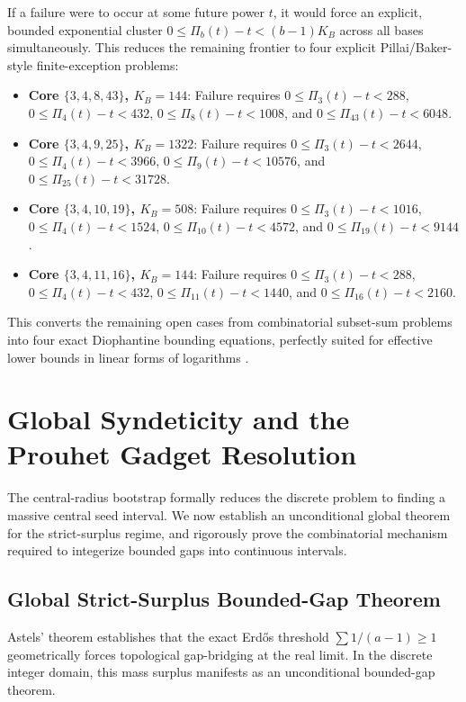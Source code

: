 \documentclass[12pt,reqno]{amsart}
\theoremstyle{definition}
\begin{document}
If a failure were to occur at some future power $t$, it would force an explicit, bounded exponential cluster $0 \le \Pi_b(t) - t < (b-1)K_B$ across all bases simultaneously. This reduces the remaining frontier to four explicit Pillai/Baker-style finite-exception problems:
\begin{itemize}
\item \textbf{Core $\{3,4,8,43\}$, $K_B = 144$}: Failure requires $0 \le \Pi_3(t) - t < 288$, $0 \le \Pi_4(t) - t < 432$, $0 \le \Pi_8(t) - t < 1008$, and $0 \le \Pi_{43}(t) - t < 6048$.
\item \textbf{Core $\{3,4,9,25\}$, $K_B = 1322$}: Failure requires $0 \le \Pi_3(t) - t < 2644$, $0 \le \Pi_4(t) - t < 3966$, $0 \le \Pi_9(t) - t < 10576$, and $0 \le \Pi_{25}(t) - t < 31728$.
\item \textbf{Core $\{3,4,10,19\}$, $K_B = 508$}: Failure requires $0 \le \Pi_3(t) - t < 1016$, $0 \le \Pi_4(t) - t < 1524$, $0 \le \Pi_{10}(t) - t < 4572$, and $0 \le \Pi_{19}(t) - t < 9144$.
\item \textbf{Core $\{3,4,11,16\}$, $K_B = 144$}: Failure requires $0 \le \Pi_3(t) - t < 288$, $0 \le \Pi_4(t) - t < 432$, $0 \le \Pi_{11}(t) - t < 1440$, and $0 \le \Pi_{16}(t) - t < 2160$.
\end{itemize}

This converts the remaining open cases from combinatorial subset-sum problems into four exact Diophantine bounding equations, perfectly suited for effective lower bounds in linear forms of logarithms \cite{BEGL}.

\section{Global Syndeticity and the Prouhet Gadget Resolution}

The central-radius bootstrap formally reduces the discrete problem to finding a massive central seed interval. We now establish an unconditional global theorem for the strict-surplus regime, and rigorously prove the combinatorial mechanism required to integerize bounded gaps into continuous intervals.

\subsection{Global Strict-Surplus Bounded-Gap Theorem}
Astels' theorem establishes that the exact Erd\H{o}s threshold $\sum 1/(a-1) \ge 1$ geometrically forces topological gap-bridging at the real limit. In the discrete integer domain, this mass surplus manifests as an unconditional bounded-gap theorem.
\end{document}
